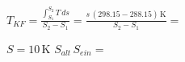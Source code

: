 \( T_{KF} = \frac{\int_{S_1}^{S_2} T \, ds}{S_2 - S_1} = \frac{s \, (298.15 - 288.15) \, \text{K}}{S_2 - S_1} = \)  

\( S = 10 \, \text{K} \)  
\( S_{alt} \, S_{ein} = \)